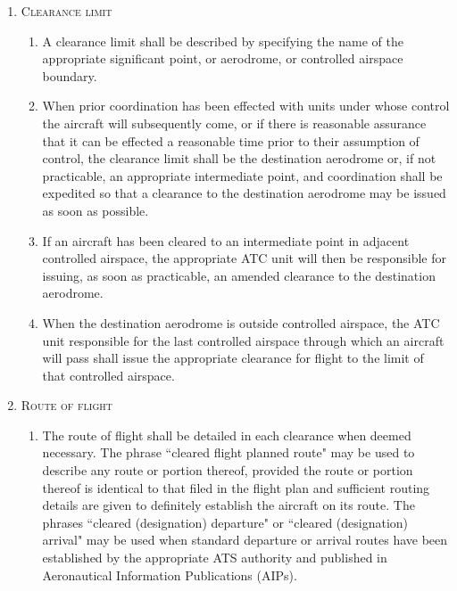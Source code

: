 \documentclass[../main.tex]{subfiles}
\begin{document}
    \begin{enumerate}[itemsep=0.2cm]\centering
        \item \textsc{Clearance limit}
        \begin{enumerate}
            \item A clearance limit shall be described by specifying the name of the appropriate significant point, or aerodrome, or controlled airspace boundary.
            \item When prior coordination has been effected with units under whose control the aircraft will subsequently come, or if there is reasonable assurance that it can be effected a reasonable time prior to their assumption of control, the clearance limit shall be the destination aerodrome or, if not practicable, an appropriate intermediate point, and coordination shall be expedited so that a clearance to the destination aerodrome may be issued as soon as possible.
            \item If an aircraft has been cleared to an intermediate point in adjacent controlled airspace, the appropriate ATC unit will then be responsible for issuing, as soon as practicable, an amended clearance to the destination aerodrome.
            \item When the destination aerodrome is outside controlled airspace, the ATC unit responsible for the last controlled airspace through which an aircraft will pass shall issue the appropriate clearance for flight to the limit of that controlled airspace.
        \end{enumerate}

        \item \textsc{Route of flight}
        \begin{enumerate}
            \item The route of flight shall be detailed in each clearance when deemed necessary. The phrase ``cleared flight planned route" may be used to describe any route or portion thereof, provided the route or portion thereof is identical to that filed in the flight plan and sufficient routing details are given to definitely establish the aircraft on its route. The phrases ``cleared (designation) departure" or ``cleared (designation) arrival" may be used when standard departure or arrival routes have been established by the appropriate ATS authority and published in Aeronautical Information Publications (AIPs).



\end{enumerate}
\end{enumerate}
\end{document}
